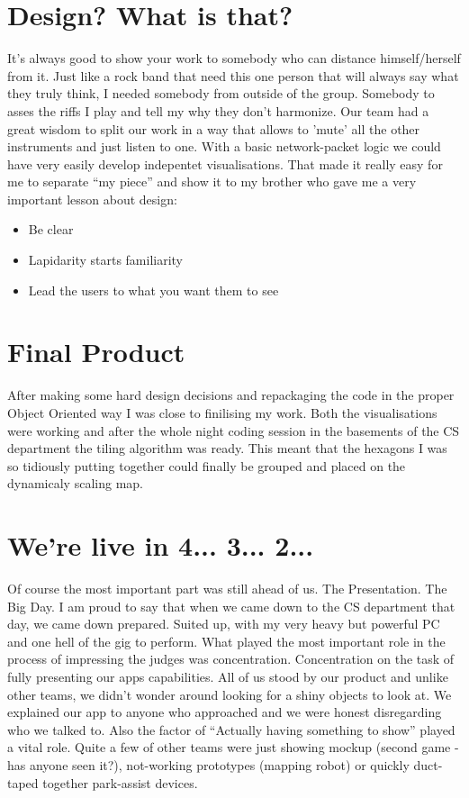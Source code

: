 \documentclass[12pt,a4paper]{article}
\begin{document}
    \section*{Design? What is that?}
	It's always good to show your work to somebody who can distance himself/herself from it. Just like a rock band that need this one person that will always say what they truly think, I needed somebody from outside of the group.
	Somebody to asses the riffs I play and tell my why they don't harmonize. Our team had a great wisdom to split our work in a way that allows to 'mute' all the other instruments and just listen to one. With a basic network-packet logic we could have very easily develop indepentet visualisations.
	That made it really easy for me to separate ``my piece'' and show it to my brother who gave me a very important lesson about design:
	\begin{itemize}
		\item Be clear
		\item Lapidarity starts familiarity
		\item Lead the users to what you want them to see
	\end{itemize}
      

        \section*{Final Product}
                After making some hard design decisions and repackaging the code in the proper Object Oriented way I was close to finilising my work. Both the visualisations were working and after the whole night coding session in the basements of the CS department the tiling algorithm was ready. This meant that the hexagons I was so tidiously putting together could finally be grouped and placed on the dynamicaly scaling map.

        \section*{We're live in 4... 3... 2...}
                Of course the most important part was still ahead of us. The Presentation. The Big Day. I am proud to say that when we came down to the CS department that day, we came down prepared. Suited up, with my very heavy but powerful PC and one hell of the gig to perform. What played the most important role in the process of impressing the judges was concentration. Concentration on the task of fully presenting our apps capabilities. All of us stood by our product and unlike other teams, we didn't wonder around looking for a shiny objects to look at. We explained our app to anyone who approached and we were honest disregarding who we talked to. Also the factor of ``Actually having something to show'' played a vital role. Quite a few of other teams were just showing mockup (second game - has anyone seen it?), not-working prototypes (mapping robot) or quickly duct-taped together park-assist devices.
\end{document}
